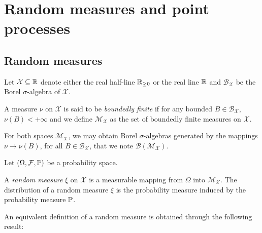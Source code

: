 \section{Random measures and point processes}\label{sec:chap1_random_measures}

\subsection{Random measures}

Let $\mathcal{X} \subseteq {\mathbb R}$ denote either the real half-line ${\mathbb R}_{\geq 0}$ or the real line ${\mathbb R}$ and $\mathcal{B}_{\mathcal{X}}$ be the Borel $\sigma$-algebra of $\mathcal{X}$.

\begin{definition}
    A measure $\nu$ on $\mathcal{X}$ is said to be \emph{boundedly finite} if for any bounded $B\in\mathcal{B}_{\mathcal{X}}$, $\nu(B) < +\infty$ and we define $\mathcal{M}_{\mathcal{X}}$ as the set of boundedly finite measures on $\mathcal{X}$.
\end{definition}

For both spaces $\mathcal{M}_{\mathcal{X}}$, we may obtain Borel $\sigma$-algebras generated by the mappings $\nu \to \nu(B)$, for all $B\in\mathcal{B}_{\mathcal{X}}$, that we note $\mathcal{B}(\mathcal{M}_{\mathcal{X}})$.

Let $(\Omega, \mathcal{F}, {\mathbb P})$ be a probability space.

\begin{definition}
    A \emph{random measure} $\xi$ on $\mathcal{X}$ is a measurable mapping from $\Omega$ into $\mathcal{M}_{\mathcal{X}}$.
    The distribution of a random measure $\xi$ is the probability measure induced by the probability measure ${\mathbb P}$.
\end{definition}

An equivalent definition of a random measure is obtained through the following result:

